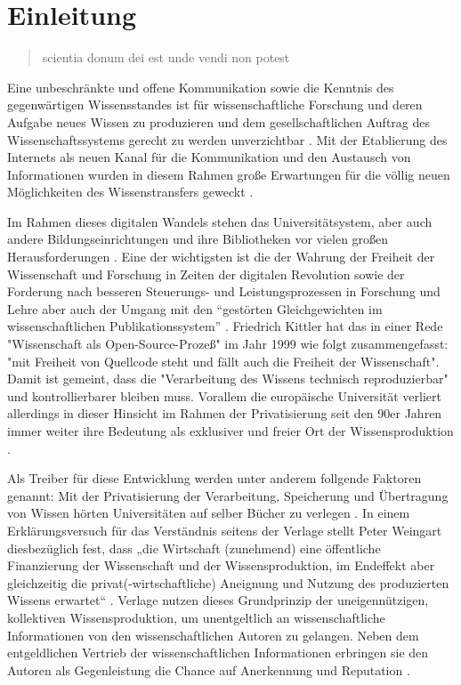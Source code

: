 \chapter{Einleitung} 

\begin{quote}
scientia donum dei est unde vendi non potest
\end{quote}Eine unbeschränkte und offene Kommunikation sowie die Kenntnis des gegenwärtigen Wissensstandes ist für wissenschaftliche Forschung und deren Aufgabe neues Wissen zu produzieren und dem gesellschaftlichen Auftrag des Wissenschaftssystems gerecht zu werden unverzichtbar \cite{Hanekop_2014} \cite{glaeser2006} \cite{gibbons_1994} \cite{Luhmann1998}. Mit der Etablierung des Internets als neuen Kanal für die Kommunikation und den Austausch von Informationen wurden in diesem Rahmen große Erwartungen für die völlig neuen Möglichkeiten des Wissenstransfers geweckt \cite{Hanekop_2014} \cite{albert_2006_open_implications} \cite{Goodrum_2001} \cite{Lawrence_1999}. 

Im Rahmen dieses digitalen Wandels stehen das Universitätsystem, aber auch andere Bildungseinrichtungen und ihre Bibliotheken vor vielen großen Herausforderungen \cite{Harter2006} \cite{Gu_don_2004} \cite{osterloh2008anreize}. Eine der wichtigsten ist die der Wahrung der Freiheit der Wissenschaft und Forschung in Zeiten der digitalen Revolution sowie der Forderung nach besseren Steuerungs- und Leistungsprozessen in Forschung und Lehre \cite{Adler_2009} \cite{gibbons_1994} aber auch der Umgang mit den “gestörten Gleichgewichten im wissenschaftlichen Publikationssystem” \cite{cite:0}. Friedrich Kittler hat das in einer Rede "Wissenschaft als Open-Source-Prozeß" im Jahr 1999 wie folgt zusammengefasst: "mit Freiheit von Quellcode steht und fällt auch die Freiheit der Wissenschaft". Damit ist gemeint, dass die "Verarbeitung des Wissens technisch reproduzierbar" \cite{cite:1} und kontrollierbarer bleiben muss. Vorallem die europäische Universität verliert allerdings in dieser Hinsicht im Rahmen der Privatisierung seit den 90er Jahren immer weiter ihre Bedeutung als exklusiver und freier Ort der Wissensproduktion \cite{suchen}.

Als Treiber für diese Entwicklung werden unter anderem follgende Faktoren genannt: Mit der Privatisierung der Verarbeitung, Speicherung und Übertragung von Wissen hörten Universitäten auf selber Bücher zu verlegen \cite{cite:0}. In einem Erklärungsversuch für das Verständnis seitens der Verlage stellt Peter Weingart diesbezüglich fest, dass „die Wirtschaft (zunehmend) eine öffentliche Finanzierung der Wissenschaft und der Wissensproduktion, im Endeffekt aber gleichzeitig die privat(-wirtschaftliche) Aneignung und Nutzung des produzierten Wissens erwartet“ \cite{cite:2}. Verlage nutzen dieses Grundprinzip der uneigennützigen, kollektiven Wissensproduktion, um unentgeltlich an wissenschaftliche Informationen von den wissenschaftlichen Autoren zu gelangen. Neben dem entgeldlichen Vertrieb der wissenschaftlichen Informationen erbringen sie den Autoren als Gegenleistung die Chance auf Anerkennung und Reputation \cite{cite:21a}. 

